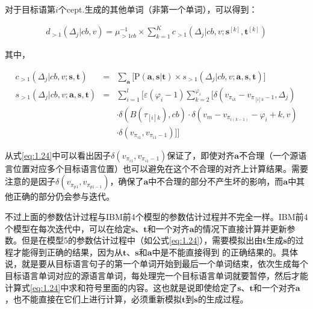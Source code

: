 \begin{appendices}
对于目标语第$i$个cept.生成的其他单词（非第一个单词），可以得到：

\begin{eqnarray}
d_{>1}(\Delta_j|cb,v) = \mu_{>1cb}^{-1} \times \sum_{k=1}^{K}c_{>1}(\Delta_j|cb,v;\mathbf{s}^{[k]},\mathbf{t}^{[k]})
\label{eq:1.26}
\end{eqnarray}

其中，

\begin{eqnarray}
c_{>1}(\Delta_j|cb,v;\mathbf{s},\mathbf{t})                   & =  & \sum_{\mathbf{a}}\Big[\textrm{P}(\mathbf{a},\mathbf{s}|\mathbf{t}) \times s_{>1}(\Delta_j|cb,v;\mathbf{a},\mathbf{s},\mathbf{t}) \Big] \label{eq:1.27} \\
s_{>1}(\Delta_j|cb,v;\mathbf{a},\mathbf{s},\mathbf{t}) & = & \sum_{i=1}^l\Big[\varepsilon(\varphi_i-1)\sum_{k=2}^{\varphi_i} \big[\delta(v_{\pi_{ik}}-v_{\pi_{[i]k}-1},\Delta_j)  \nonumber \\
                                                                                    &     & \cdot \delta(B(\tau_{[i]k}) ,cb) \cdot \delta(v_m-v_{\pi_{i(k-1)}}-\varphi_i+k,v) \nonumber \\
                                                                                    &     & \cdot \delta(v_{\pi_{i1}},v_{\pi_{i1}-1}) \big] \Big] \label{eq:1.28}
\end{eqnarray}

\vspace{0.5em}

\parinterval 从式\ref{eq:1.24}中可以看出因子$\delta(v_{\pi_{i1}},v_{\pi_{i1}-1})$保证了，即使对齐$\mathbf{a}$不合理（一个源语言位置对应多个目标语言位置）也可以避免在这个不合理的对齐上计算结果。需要注意的是因子$\delta(v_{\pi_{p1}},v_{\pi_{p1-1}})$，确保了$\mathbf{a}$中不合理的部分不产生坏的影响，而$\mathbf{a}$中其他正确的部分仍会参与迭代。

\parinterval 不过上面的参数估计过程与IBM前4个模型的参数估计过程并不完全一样。IBM前4个模型在每次迭代中，可以在给定$\mathbf{s}$、$\mathbf{t}$和一个对齐$\mathbf{a}$的情况下直接计算并更新参数。但是在模型5的参数估计过程中（如公式\ref{eq:1.24}），需要模拟出由$\mathbf{t}$生成$\mathbf{s}$的过程才能得到正确的结果，因为从$\mathbf{t}$、$\mathbf{s}$和$\mathbf{a}$中是不能直接得到 的正确结果的。具体说，就是要从目标语言句子的第一个单词开始到最后一个单词结束，依次生成每个目标语言单词对应的源语言单词，每处理完一个目标语言单词就要暂停，然后才能计算式\ref{eq:1.24}中求和符号里面的内容。这也就是说即使给定了$\mathbf{s}$、$\mathbf{t}$和一个对齐$\mathbf{a}$，也不能直接在它们上进行计算，必须重新模拟$\mathbf{t}$到$\mathbf{s}$的生成过程。


\end{appendices}
